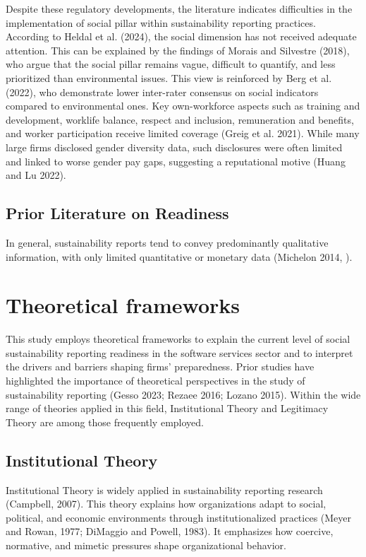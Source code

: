 Despite these regulatory developments, the literature indicates difficulties in the implementation 
of social pillar within sustainability reporting practices. According to Heldal et al. (2024), the social dimension 
has not received adequate attention. This can be explained by the findings of Morais and Silvestre (2018), 
who argue that the social pillar remains vague, difficult to quantify, and less prioritized than 
environmental issues. This view is reinforced by Berg et al. (2022), who demonstrate lower inter-rater 
consensus on social indicators compared to environmental ones. Key own-workforce aspects such as training and development, 
worklife balance, respect and inclusion, remuneration and benefits, and worker participation receive
limited coverage (Greig et al. 2021). While many large firms disclosed gender diversity data,
such disclosures were often limited and linked to worse gender pay gaps, suggesting a reputational motive 
(Huang and Lu 2022). 

\subsection{Prior Literature on Readiness}

In general, sustainability reports tend to convey 
predominantly qualitative information, with only limited quantitative or monetary data (Michelon 2014, ). 


\section{Theoretical frameworks}

This study employs theoretical frameworks to explain the current level 
of social sustainability reporting readiness in the software services sector 
and to interpret the drivers and barriers shaping firms' preparedness.
Prior studies have highlighted the importance of theoretical perspectives 
in the study of sustainability reporting (Gesso 2023; Rezaee 2016; Lozano 2015).
Within the wide range of theories applied in this field, Institutional Theory
and Legitimacy Theory are among those frequently employed.

\subsection{Institutional Theory}
Institutional Theory is widely applied in sustainability 
reporting research (Campbell, 2007). This theory explains 
how organizations adapt to social, political, and economic environments 
through institutionalized practices 
(Meyer and Rowan, 1977; DiMaggio and Powell, 1983).
It emphasizes how coercive, normative, and mimetic pressures shape organizational behavior.


